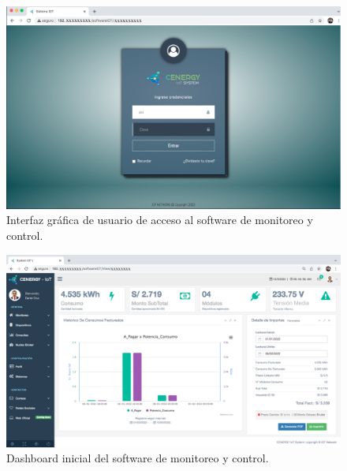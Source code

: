 \begin{itemize}


\end{itemize}






\begin{landscape} %
\begin{figure}[htpb]
\centering 
\includegraphics[width=1.55\textwidth]{./Figures/gui/0.png}
\caption{Interfaz gráfica de usuario de acceso al software de monitoreo y control.}
\label{fig:gui0}
\end{figure}
\end{landscape} %


\begin{landscape} %
\begin{figure}[htpb]
\centering 
\includegraphics[width=1.55\textwidth]{./Figures/gui/1.png}
\caption{Dashboard inicial del software de monitoreo y control.}
\label{fig:gui1}
\end{figure}
\end{landscape} %


